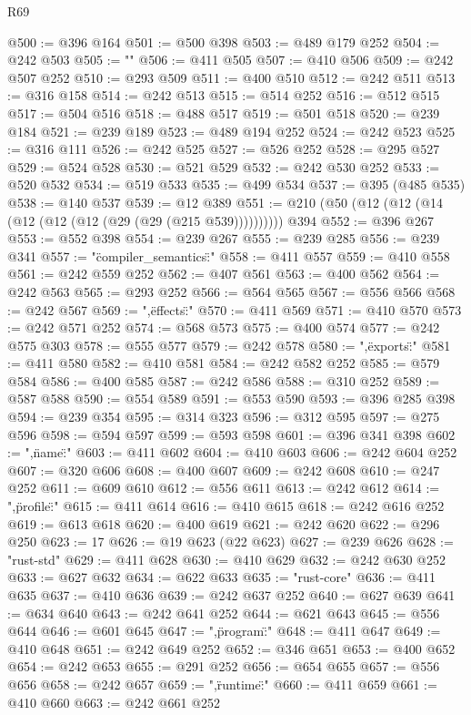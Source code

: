 \begin{lexlean}{R69}
\begin{coremodule}
@500 := @396 @164
@501 := @500 @398
@503 := @489 @179 @252
@504 := @242 @503
@505 := "\n"
@506 := @411 @505
@507 := @410 @506
@509 := @242 @507 @252
@510 := @293 @509
@511 := @400 @510
@512 := @242 @511
@513 := @316 @158
@514 := @242 @513
@515 := @514 @252
@516 := @512 @515
@517 := @504 @516
@518 := @488 @517
@519 := @501 @518
@520 := @239 @184
@521 := @239 @189
@523 := @489 @194 @252
@524 := @242 @523
@525 := @316 @111
@526 := @242 @525
@527 := @526 @252
@528 := @295 @527
@529 := @524 @528
@530 := @521 @529
@532 := @242 @530 @252
@533 := @520 @532
@534 := @519 @533
@535 := @499 @534
@537 := @395 (@485 @535)
@538 := @140 @537
@539 := @12 @389
@551 := @210 (@50 (@12 (@12 (@14 (@12 (@12 (@12 (@29 (@29 (@215 @539)))))))))) @394
@552 := @396 @267
@553 := @552 @398
@554 := @239 @267
@555 := @239 @285
@556 := @239 @341
@557 := "{\"compiler_semantics\":"
@558 := @411 @557
@559 := @410 @558
@561 := @242 @559 @252
@562 := @407 @561
@563 := @400 @562
@564 := @242 @563
@565 := @293 @252
@566 := @564 @565
@567 := @556 @566
@568 := @242 @567
@569 := ",\"effects\":"
@570 := @411 @569
@571 := @410 @570
@573 := @242 @571 @252
@574 := @568 @573
@575 := @400 @574
@577 := @242 @575 @303
@578 := @555 @577
@579 := @242 @578
@580 := ",\"exports\":"
@581 := @411 @580
@582 := @410 @581
@584 := @242 @582 @252
@585 := @579 @584
@586 := @400 @585
@587 := @242 @586
@588 := @310 @252
@589 := @587 @588
@590 := @554 @589
@591 := @553 @590
@593 := @396 @285 @398
@594 := @239 @354
@595 := @314 @323
@596 := @312 @595
@597 := @275 @596
@598 := @594 @597
@599 := @593 @598
@601 := @396 @341 @398
@602 := ",\"name\":"
@603 := @411 @602
@604 := @410 @603
@606 := @242 @604 @252
@607 := @320 @606
@608 := @400 @607
@609 := @242 @608
@610 := @247 @252
@611 := @609 @610
@612 := @556 @611
@613 := @242 @612
@614 := ",\"profile\":"
@615 := @411 @614
@616 := @410 @615
@618 := @242 @616 @252
@619 := @613 @618
@620 := @400 @619
@621 := @242 @620
@622 := @296 @250
@623 := 17
@626 := @19 @623 (@22 @623)
@627 := @239 @626
@628 := "rust-std"
@629 := @411 @628
@630 := @410 @629
@632 := @242 @630 @252
@633 := @627 @632
@634 := @622 @633
@635 := "rust-core"
@636 := @411 @635
@637 := @410 @636
@639 := @242 @637 @252
@640 := @627 @639
@641 := @634 @640
@643 := @242 @641 @252
@644 := @621 @643
@645 := @556 @644
@646 := @601 @645
@647 := ",\"program\":"
@648 := @411 @647
@649 := @410 @648
@651 := @242 @649 @252
@652 := @346 @651
@653 := @400 @652
@654 := @242 @653
@655 := @291 @252
@656 := @654 @655
@657 := @556 @656
@658 := @242 @657
@659 := ",\"runtime\":"
@660 := @411 @659
@661 := @410 @660
@663 := @242 @661 @252
}
\end{coremodule}
\end{lexlean}
